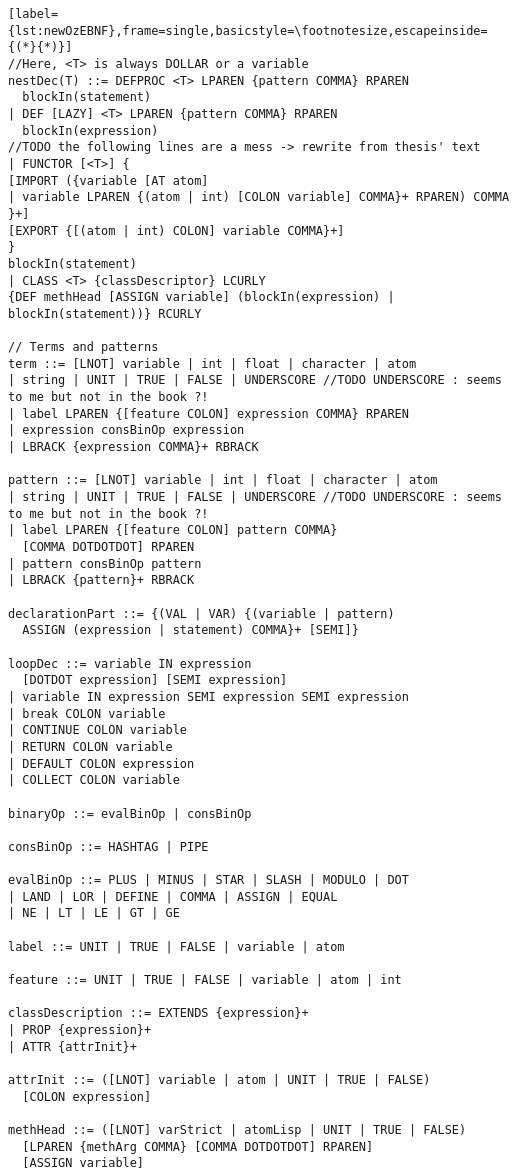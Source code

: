 \begin{lstlisting}[label={lst:newOzEBNF},frame=single,basicstyle=\footnotesize,escapeinside={(*}{*)}]
//Here, <T> is always DOLLAR or a variable
nestDec(T) ::= DEFPROC <T> LPAREN {pattern COMMA} RPAREN
  blockIn(statement)
| DEF [LAZY] <T> LPAREN {pattern COMMA} RPAREN
  blockIn(expression)
//TODO the following lines are a mess -> rewrite from thesis' text
| FUNCTOR [<T>] {
[IMPORT ({variable [AT atom]
| variable LPAREN {(atom | int) [COLON variable] COMMA}+ RPAREN) COMMA
}+]
[EXPORT {[(atom | int) COLON] variable COMMA}+]
}
blockIn(statement)
| CLASS <T> {classDescriptor} LCURLY
{DEF methHead [ASSIGN variable] (blockIn(expression) | blockIn(statement))} RCURLY

// Terms and patterns
term ::= [LNOT] variable | int | float | character | atom
| string | UNIT | TRUE | FALSE | UNDERSCORE //TODO UNDERSCORE : seems to me but not in the book ?!
| label LPAREN {[feature COLON] expression COMMA} RPAREN
| expression consBinOp expression
| LBRACK {expression COMMA}+ RBRACK

pattern ::= [LNOT] variable | int | float | character | atom
| string | UNIT | TRUE | FALSE | UNDERSCORE //TODO UNDERSCORE : seems to me but not in the book ?!
| label LPAREN {[feature COLON] pattern COMMA}
  [COMMA DOTDOTDOT] RPAREN
| pattern consBinOp pattern
| LBRACK {pattern}+ RBRACK

declarationPart ::= {(VAL | VAR) {(variable | pattern)
  ASSIGN (expression | statement) COMMA}+ [SEMI]}

loopDec ::= variable IN expression
  [DOTDOT expression] [SEMI expression]
| variable IN expression SEMI expression SEMI expression
| break COLON variable
| CONTINUE COLON variable
| RETURN COLON variable
| DEFAULT COLON expression
| COLLECT COLON variable

binaryOp ::= evalBinOp | consBinOp

consBinOp ::= HASHTAG | PIPE

evalBinOp ::= PLUS | MINUS | STAR | SLASH | MODULO | DOT
| LAND | LOR | DEFINE | COMMA | ASSIGN | EQUAL
| NE | LT | LE | GT | GE

label ::= UNIT | TRUE | FALSE | variable | atom

feature ::= UNIT | TRUE | FALSE | variable | atom | int

classDescription ::= EXTENDS {expression}+
| PROP {expression}+
| ATTR {attrInit}+

attrInit ::= ([LNOT] variable | atom | UNIT | TRUE | FALSE)
  [COLON expression]

methHead ::= ([LNOT] varStrict | atomLisp | UNIT | TRUE | FALSE)
  [LPAREN {methArg COMMA} [COMMA DOTDOTDOT] RPAREN]
  [ASSIGN variable]


\end{lstlisting}
